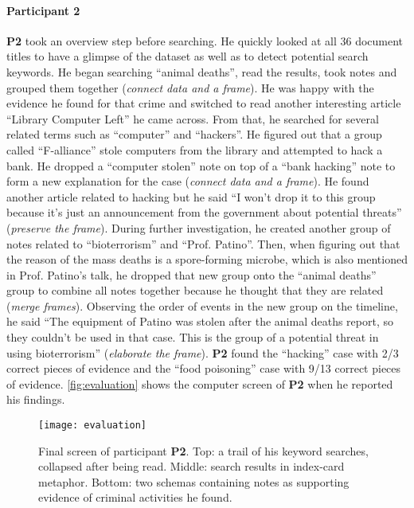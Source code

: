 \paragraph{Participant 2}
\textbf{P2} took an overview step before searching. He quickly looked at all 36 document titles to have a glimpse of the dataset as well as to detect potential search keywords. He began searching ``animal deaths'', read the results, took notes and grouped them together (\emph{connect data and a frame}). He was happy with the evidence he found for that crime and switched to read another interesting article ``Library Computer Left'' he came across. From that, he searched for several related terms such as ``computer'' and ``hackers''. He figured out that a group called ``F-alliance'' stole computers from the library and attempted to hack a bank. He dropped a ``computer stolen'' note on top of a ``bank hacking'' note to form a new explanation for the case (\emph{connect data and a frame}). He found another article related to hacking but he said ``I won't drop it to this group because it's just an announcement from the government about potential threats'' (\emph{preserve the frame}). During further investigation, he created another group of notes related to ``bioterrorism'' and ``Prof. Patino''. Then, when figuring out that the reason of the mass deaths is a spore-forming microbe, which is also mentioned in Prof. Patino's talk, he dropped that new group onto the ``animal deaths'' group to combine all notes together because he thought that they are related (\emph{merge frames}). Observing the order of events in the new group on the timeline, he said ``The equipment of Patino was stolen after the animal deaths report, so they couldn't be used in that case. This is the group of a potential threat in using bioterrorism'' (\emph{elaborate the frame}). \textbf{P2} found the ``hacking'' case with 2/3 correct pieces of evidence and the ``food poisoning'' case with 9/13 correct pieces of evidence. \autoref{fig:evaluation} shows the computer screen of \textbf{P2} when he reported his findings.

\begin{figure*}[!htb]
	\centering
	\texttt{[image: evaluation]}
	\caption{Final screen of participant \textbf{P2}. Top: a trail of his keyword searches, collapsed after being read. Middle: search results in index-card metaphor. Bottom: two schemas containing notes as supporting evidence of criminal activities he found.}
	\label{fig:evaluation}
\end{figure*}

